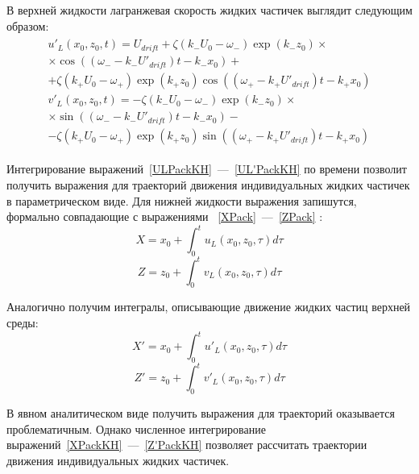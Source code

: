 В верхней жидкости лагранжевая скорость жидких частичек выглядит следующим образом:
\begin{gather}
\begin{gathered}
u'_{L}\left( x_{0}, z_{0}, t \right)=U_{drift}+\zeta \left(k_{-}U_{0}- \omega_{-}\right)\exp \left( k_{-} z_{0}\right) \times \\
\times \cos \left( \left( \omega_{-}-k_{-} U'_{drift}\right) t - k_{-} x_{0} \right)+\\
+\zeta \left(k_{+}U_{0}- \omega_{+}\right)\exp \left( k_{+} z_{0}\right) \cos \left( \left( \omega_{+}-k_{+} U'_{drift}\right)  t - k_{+} x_{0} \right)\\
v'_{L}\left( x_{0}, z_{0}, t \right)=-\zeta \left(k_{-}U_{0}- \omega_{-}\right)\exp \left( k_{-} z_{0}\right) \times\\
\times \sin \left( \left( \omega_{-}-k_{-} U'_{drift}\right) t - k_{-} x_{0} \right)-\\
-\zeta \left(k_{+}U_{0}- \omega_{+}\right)\exp \left( k_{+} z_{0}\right) \sin \left( \left( \omega_{+}-k_{+} U'_{drift}\right)  t - k_{+} x_{0} \right)
\label{UL'PackKH}
\end{gathered}
\end{gather}	  
	  	
Интегрирование выражений~\eqref{ULPackKH}~---~\eqref{UL'PackKH} по времени позволит получить выражения для траекторий движения индивидуальных жидких частичек в параметрическом виде. Для нижней жидкости выражения запишутся, формально совпадающие с выражениями ~\eqref{XPack}~---~\eqref{ZPack} :
\begin{equation}
X=x_{0}+\int_{0}^{t}u_{L}\left( x_{0}, z_{0}, \tau \right)d\tau
\label{XPackKH}
\end{equation}
\begin{equation}
Z=z_{0}+\int_{0}^{t}v_{L}\left( x_{0}, z_{0}, \tau \right)d\tau
\label{ZPackKH}
\end{equation}	  
	  	
Аналогично получим интегралы, описывающие движение жидких частиц верхней среды:
\begin{equation}
X'=x_{0}+\int_{0}^{t}u'_{L}\left( x_{0}, z_{0}, \tau \right)d\tau
\label{X'PackKH}
\end{equation}
\begin{equation}
Z'=z_{0}+\int_{0}^{t}v'_{L}\left( x_{0}, z_{0}, \tau \right)d\tau
\label{Z'PackKH}
\end{equation}	   	
	  	
В явном аналитическом виде получить выражения для траекторий оказывается проблематичным. Однако численное интегрирование выражений~\eqref{XPackKH}~---~\eqref{Z'PackKH}  позволяет рассчитать траектории движения индивидуальных жидких частичек. 

